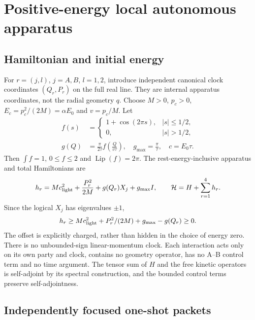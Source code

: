 \documentclass[11pt]{article}
\newcommand{\Hil}{\mathcal H}
\newcommand{\Lip}{\operatorname{Lip}}
\begin{document}
\section{Positive-energy local autonomous apparatus}\label{sec:clocks}

\subsection{Hamiltonian and initial energy}

For $r=(j,l)$, $j=A,B$, $l=1,2$, introduce independent canonical clock coordinates $(Q_r,P_r)$ on the full real line.
They are internal apparatus coordinates, not the radial geometry $q$.
Choose $M>0$, $p_c>0$, $E_c=p_c^2/(2M)=\alpha E_0$ and $v=p_c/M$.
Let
\begin{align}
 f(s)&=\begin{cases}1+\cos(2\pi s),&|s|\le1/2,\\0,&|s|>1/2,\end{cases}\nonumber\\
 g(Q)&=\frac\pi{2\tau}f\left(\frac Q{v\tau}\right),\quad
 g_{\max}=\frac\pi\tau,\quad c=E_0\tau.\label{eq:pulse}
\end{align}
Then $\int f=1$, $0\le f\le2$ and $\Lip(f)=2\pi$.
The rest-energy-inclusive apparatus and total Hamiltonians are
\begin{equation}
 h_r=Mc_{\rm light}^2+\frac{P_r^2}{2M}+g(Q_r)X_j+g_{\max}I,
 \qquad\Hil=H+\sum_{r=1}^4h_r.\label{eq:autonomous}
\end{equation}
Since the logical $X_j$ has eigenvalues $\pm1$,
\begin{equation}
 h_r\ge Mc_{\rm light}^2+P_r^2/(2M)+g_{\max}-g(Q_r)\ge0.\label{eq:apppos}
\end{equation}
The offset is explicitly charged, rather than hidden in the choice of energy zero.
There is no unbounded-sign linear-momentum clock.
Each interaction acts only on its own party and clock, contains no geometry operator, has no A--B control term and no time argument.
The tensor sum of $H$ and the free kinetic operators is self-adjoint by its spectral construction, and the bounded control terms preserve self-adjointness.

\subsection{Independently focused one-shot packets}
\end{document}
